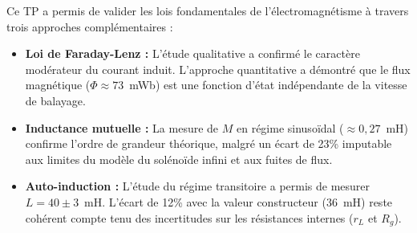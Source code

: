 \documentclass[a4paper,9pt,french]{scrartcl}
\begin{document}




Ce TP a permis de valider les lois fondamentales de l'électromagnétisme à travers trois approches complémentaires :

\begin{itemize}
    \item \textbf{Loi de Faraday-Lenz :} L'étude qualitative a confirmé le caractère modérateur du courant induit. L'approche quantitative a démontré que le flux magnétique ($\Phi \approx 73$~mWb) est une fonction d'état indépendante de la vitesse de balayage.
    \item \textbf{Inductance mutuelle :} La mesure de $M$ en régime sinusoïdal ($\approx 0,27$~mH) confirme l'ordre de grandeur théorique, malgré un écart de 23\% imputable aux limites du modèle du solénoïde infini et aux fuites de flux.
    \item \textbf{Auto-induction :} L'étude du régime transitoire a permis de mesurer $L = 40 \pm 3$~mH. L'écart de 12\% avec la valeur constructeur (36~mH) reste cohérent compte tenu des incertitudes sur les résistances internes ($r_L$ et $R_g$).
\end{itemize}
\end{document}
